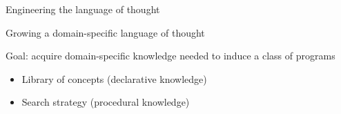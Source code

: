 \documentclass{beamer}
\begin{document}
\begin{frame}{Engineering the language of thought}
\end{frame}





\begin{frame}{Growing a domain-specific language of thought}
  
  Goal: acquire domain-specific knowledge needed to induce a class of programs


  
  \pause
  \vspace{1cm}

  \begin{itemize}
  \item Library of concepts (declarative knowledge)
    \item Search strategy (procedural knowledge)
    \end{itemize}
\end{frame}
\end{document}
